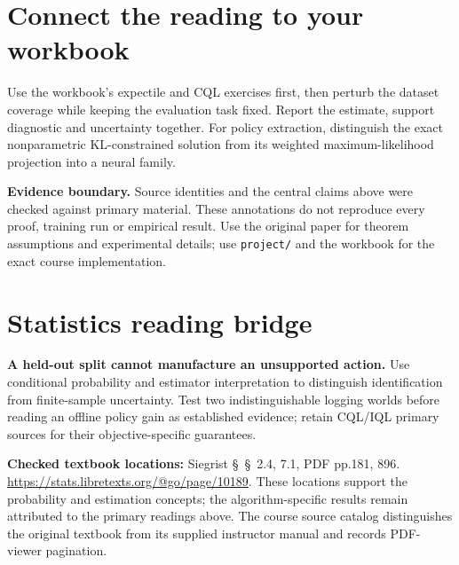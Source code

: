 \documentclass[11pt]{scrartcl}
\begin{document}
\section*{Connect the reading to your workbook}
Use the workbook's expectile and CQL exercises first, then perturb the dataset coverage while keeping the evaluation task fixed. Report the estimate, support diagnostic and uncertainty together. For policy extraction, distinguish the exact nonparametric KL-constrained solution from its weighted maximum-likelihood projection into a neural family.

\noindent\textbf{Evidence boundary.} Source identities and the central claims above were checked against primary material. These annotations do not reproduce every proof, training run or empirical result. Use the original paper for theorem assumptions and experimental details; use \texttt{project/} and the workbook for the exact course implementation.
\section*{Statistics reading bridge}
\textbf{A held-out split cannot manufacture an unsupported action.} Use conditional probability and estimator interpretation to distinguish identification from finite-sample uncertainty. Test two indistinguishable logging worlds before reading an offline policy gain as established evidence; retain CQL/IQL primary sources for their objective-specific guarantees.

\textbf{Checked textbook locations:} Siegrist \S~\S~2.4, 7.1, PDF pp.181, 896. \url{https://stats.libretexts.org/@go/page/10189}. These locations support the probability and estimation concepts; the algorithm-specific results remain attributed to the primary readings above. The course source catalog distinguishes the original textbook from its supplied instructor manual and records PDF-viewer pagination.
\end{document}
